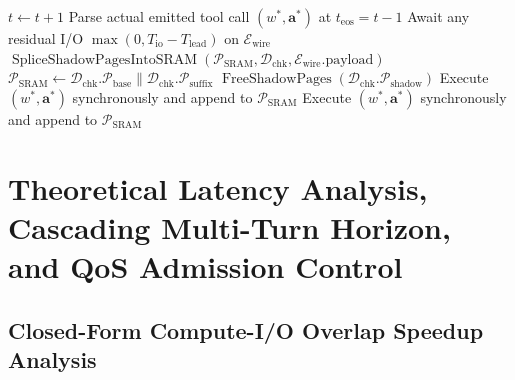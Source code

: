 \documentclass[10pt,conference]{IEEEtran}
\begin{document}
\begin{algorithm}[t]
{\begin{minipage}{1.30\columnwidth}
\begin{algorithmic}[1]
    \EndIf
    \State $t \leftarrow t + 1$
\EndWhile
\State Parse actual emitted tool call $(w^*, \mathbf{a}^*)$ at $t_{\text{eos}} = t - 1$
        \State Await any residual I/O $\max(0, T_{\text{io}} - T_{\text{lead}})$ on $\mathcal{E}_{\text{wire}}$
        \State $\operatorname{SpliceShadowPagesIntoSRAM}(\mathcal{P}_{\text{SRAM}}, \mathcal{D}_{\text{chk}}, \mathcal{E}_{\text{wire}}.\text{payload})$ 
    \Else
        \State $\mathcal{P}_{\text{SRAM}} \leftarrow \mathcal{D}_{\text{chk}}.\mathcal{P}_{\text{base}} \parallel \mathcal{D}_{\text{chk}}.\mathcal{P}_{\text{suffix}}$ 
        \State $\operatorname{FreeShadowPages}(\mathcal{D}_{\text{chk}}.\mathcal{P}_{\text{shadow}})$
        \State Execute $(w^*, \mathbf{a}^*)$ synchronously and append to $\mathcal{P}_{\text{SRAM}}$
    \EndIf
\Else
    \State Execute $(w^*, \mathbf{a}^*)$ synchronously and append to $\mathcal{P}_{\text{SRAM}}$
\EndIf
\end{algorithmic}
\end{minipage}%
}
\end{algorithm}

\section{Theoretical Latency Analysis, Cascading Multi-Turn Horizon, and QoS Admission Control}
\label{sec:theory_cascading}

\subsection{Closed-Form Compute-I/O Overlap Speedup Analysis}
\end{document}
